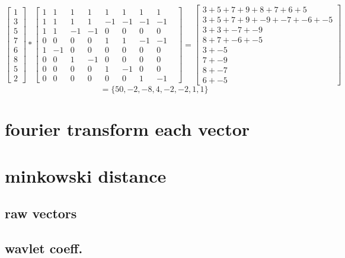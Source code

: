 \documentclass{article}
\begin{document}
\[ 
	\begin{bmatrix}
		1 \\
		3 \\
		5 \\
		7 \\
		6 \\
		8 \\
		5 \\
		2 
	\end{bmatrix}
		*  
\begin{bmatrix} 
	1&1&1&1&1&1&1&1 \\ 
	1&1&1&1&-1&-1&-1&-1 \\
	1&1&-1&-1&0&0&0&0& \\ 
	0&0&0&0&1&1&-1&-1 \\ 
	1&-1&0&0&0&0&0&0& \\
	0&0&1&-1&0&0&0&0 \\ 
	0&0&0&0&1&-1&0&0& \\ 
	0&0&0&0&0&0&1&-1 
\end{bmatrix}
=
\begin{bmatrix}
	3 + 5 + 7 + 9 + 8 + 7 + 6 + 5 \\
	3 + 5 + 7 + 9 + -9 + -7 + -6 + -5 \\
	3 + 3 + -7 + -9 \\
	8 + 7 + -6 + -5 \\
	3 + -5 \\
	7 + -9 \\
	8 + -7 \\
	6 + -5
\end{bmatrix}
\]
\[
	= \{ 50, -2, -8, 4, -2, -2, 1, 1 \}
\]



\section{fourier transform each vector}

\section{minkowski distance}

\subsection{raw vectors}


\subsection{wavlet coeff.}
\end{document}
